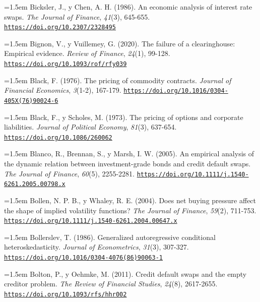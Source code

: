 \documentclass[10pt,a4paper]{article}
\begin{document}
\noindent\hangindent=1.5em Bicksler, J., y Chen, A. H. (1986). An economic analysis of interest rate swaps. \textit{The Journal of Finance}, \textit{41}(3), 645-655. \href{https://doi.org/10.2307/2328495}{\nolinkurl{https://doi.org/10.2307/2328495}}

\noindent\hangindent=1.5em Bignon, V., y Vuillemey, G. (2020). The failure of a clearinghouse: Empirical evidence. \textit{Review of Finance}, \textit{24}(1), 99-128. \href{https://doi.org/10.1093/rof/rfy039}{\nolinkurl{https://doi.org/10.1093/rof/rfy039}}

\noindent\hangindent=1.5em Black, F. (1976). The pricing of commodity contracts. \textit{Journal of Financial Economics}, \textit{3}(1-2), 167-179. \href{https://doi.org/10.1016/0304-405X(76)90024-6}{\nolinkurl{https://doi.org/10.1016/0304-405X(76)90024-6}}

\noindent\hangindent=1.5em Black, F., y Scholes, M. (1973). The pricing of options and corporate liabilities. \textit{Journal of Political Economy}, \textit{81}(3), 637-654. \href{https://doi.org/10.1086/260062}{\nolinkurl{https://doi.org/10.1086/260062}}

{\sloppy\noindent\hangindent=1.5em Blanco, R., Brennan, S., y Marsh, I. W. (2005). An empirical analysis of the dynamic relation between investment-grade bonds and credit default swaps. \textit{The Journal of Finance}, \textit{60}(5), 2255-2281. \href{https://doi.org/10.1111/j.1540-6261.2005.00798.x}{\nolinkurl{https://doi.org/10.1111/j.1540-6261.2005.00798.x}}\par}

\noindent\hangindent=1.5em Bollen, N. P. B., y Whaley, R. E. (2004). Does net buying pressure affect the shape of implied volatility functions? \textit{The Journal of Finance}, \textit{59}(2), 711-753. \href{https://doi.org/10.1111/j.1540-6261.2004.00647.x}{\nolinkurl{https://doi.org/10.1111/j.1540-6261.2004.00647.x}}

\noindent\hangindent=1.5em Bollerslev, T. (1986). Generalized autoregressive conditional heteroskedasticity. \textit{Journal of Econometrics}, \textit{31}(3), 307-327. \href{https://doi.org/10.1016/0304-4076(86)90063-1}{\nolinkurl{https://doi.org/10.1016/0304-4076(86)90063-1}}

\noindent\hangindent=1.5em Bolton, P., y Oehmke, M. (2011). Credit default swaps and the empty creditor problem. \textit{The Review of Financial Studies}, \textit{24}(8), 2617-2655. \href{https://doi.org/10.1093/rfs/hhr002}{\nolinkurl{https://doi.org/10.1093/rfs/hhr002}}
\end{document}
